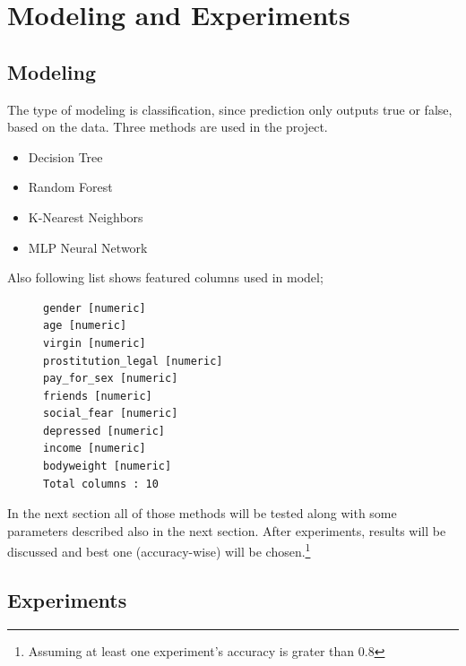 \documentclass{article}
\begin{document}

	

\section{Modeling and Experiments}

\subsection{Modeling}

The type of modeling is classification, since prediction only outputs true or false, based on the data. Three methods are used in the project.

\begin{itemize}
  \item Decision Tree
  \item Random Forest
  \item  K-Nearest Neighbors
  \item  MLP Neural Network
\end{itemize}

Also following list shows featured columns used in model;

\begin{figure}[H]
\centering
\begin{BVerbatim}
gender [numeric]
age [numeric]
virgin [numeric]
prostitution_legal [numeric]
pay_for_sex [numeric]
friends [numeric]
social_fear [numeric]
depressed [numeric]
income [numeric]
bodyweight [numeric]
Total columns : 10
\end{BVerbatim}

\end{figure}

In the next section all of those methods will be tested along with some parameters described also in the next section. After experiments, results will be discussed and best one (accuracy-wise) will be chosen.\footnote{Assuming at least one experiment's accuracy is grater than 0.8}


\subsection{Experiments}
\newpage
\end{document}
